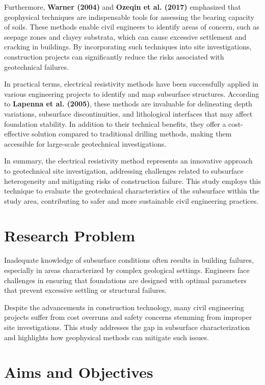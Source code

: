\documentclass[12pt,a4paper]{report}
\begin{document}
Furthermore, \textbf{Warner (2004)} and \textbf{Ozeqin et al. (2017)} emphasized that geophysical techniques are indispensable tools for assessing the bearing capacity of soils. These methods enable civil engineers to identify areas of concern, such as seepage zones and clayey substrata, which can cause excessive settlement and cracking in buildings. By incorporating such techniques into site investigations, construction projects can significantly reduce the risks associated with geotechnical failures.

In practical terms, electrical resistivity methods have been successfully applied in various engineering projects to identify and map subsurface structures. According to \textbf{Lapenna et al. (2005)}, these methods are invaluable for delineating depth variations, subsurface discontinuities, and lithological interfaces that may affect foundation stability. In addition to their technical benefits, they offer a cost-effective solution compared to traditional drilling methods, making them accessible for large-scale geotechnical investigations.

In summary, the electrical resistivity method represents an innovative approach to geotechnical site investigation, addressing challenges related to subsurface heterogeneity and mitigating risks of construction failure. This study employs this technique to evaluate the geotechnical characteristics of the subsurface within the study area, contributing to safer and more sustainable civil engineering practices.

\section{Research Problem}
Inadequate knowledge of subsurface conditions often results in building failures, especially in areas characterized by complex geological settings. Engineers face challenges in ensuring that foundations are designed with optimal parameters that prevent excessive settling or structural failures.

Despite the advancements in construction technology, many civil engineering projects suffer from cost overruns and safety concerns stemming from improper site investigations. This study addresses the gap in subsurface characterization and highlights how geophysical methods can mitigate such issues.

\section{Aims and Objectives}
\end{document}
